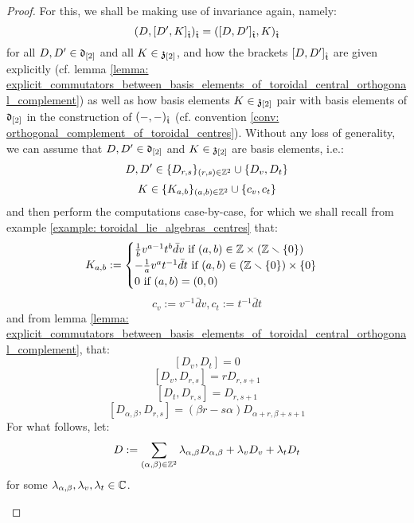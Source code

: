             \begin{proof}
                For this, we shall be making use of invariance again, namely:
                    $$(D, [D', K]_{\hat{\mathfrak{t}}})_{\hat{\mathfrak{t}}} = ([D, D']_{\hat{\mathfrak{t}}}, K)_{\hat{\mathfrak{t}}}$$
                for all $D, D' \in \mathfrak{d}_{[2]}$ and all $K \in \mathfrak{z}_{[2]}$, and how the brackets $[D, D']_{\hat{\mathfrak{t}}}$ are given explicitly (cf. lemma \ref{lemma: explicit_commutators_between_basis_elements_of_toroidal_central_orthogonal_complement}) as well as how basis elements $K \in \mathfrak{z}_{[2]}$ pair with basis elements of $\mathfrak{d}_{[2]}$ in the construction of $(-, -)_{\hat{\mathfrak{t}}}$ (cf. convention \ref{conv: orthogonal_complement_of_toroidal_centres}). Without any loss of generality, we can assume that $D, D' \in \mathfrak{d}_{[2]}$ and $K \in \mathfrak{z}_{[2]}$ are basis elements, i.e.:
                    $$D, D' \in \{D_{r, s}\}_{(r, s) \in \mathbb{Z}^2} \cup \{D_v, D_t\}$$
                    $$K \in \{K_{a, b}\}_{(a, b) \in \mathbb{Z}^2} \cup \{c_v, c_t\}$$
                and then perform the computations case-by-case, for which we shall recall from example \ref{example: toroidal_lie_algebras_centres} that:
                    $$
                        K_{a, b} :=
                        \begin{cases}
                            \text{$\frac1b v^{a - 1} t^b \bar{d}v$ if $(a, b) \in \Z \x (\Z \setminus \{0\})$}
                            \\
                            \text{$-\frac1a v^a t^{-1} \bar{d}t$ if $(a, b) \in (\Z \setminus \{0\}) \x \{0\}$}
                            \\
                            \text{$0$ if $(a, b) = (0, 0)$}
                        \end{cases}
                    $$
                    $$c_v := v^{-1} \bar{d}v, c_t := t^{-1} \bar{d}t$$
                and from lemma \ref{lemma: explicit_commutators_between_basis_elements_of_toroidal_central_orthogonal_complement}, that:
                    $$[D_v, D_t] = 0$$
                    $$[D_v, D_{r, s}] = r D_{r, s + 1}$$
                    $$[D_t, D_{r, s}] = D_{r, s + 1}$$
                    $$[D_{\alpha, \beta}, D_{r, s}] = (\beta r - s \alpha) D_{\alpha + r, \beta + s + 1}$$
                For what follows, let:
                    $$D := \sum_{(\alpha, \beta) \in \mathbb{Z}^2} \lambda_{\alpha, \beta} D_{\alpha, \beta} + \lambda_v D_v + \lambda_t D_t$$
                for some $\lambda_{\alpha, \beta}, \lambda_v, \lambda_t \in \mathbb{C}$.
                \begin{enumerate}

\end{enumerate}
\end{proof}
